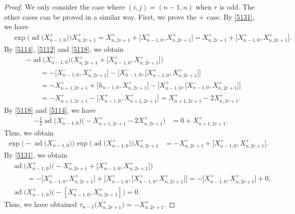 \documentclass[pdftex]{sigma}
\numberwithin{equation}{section}
\theoremstyle{definition}
\DeclareMathOperator{\ad}{ad}
\begin{document}
\begin{proof}
We only consider the case where $(i,j)=(n-1,n)$ when $r$ is odd. The other cases can be proved in a similar way. First, we prove the $+$ case. By \eqref{5131}, we have
\begin{align*}
&\exp\bigl(\ad\bigl(X^+_{n-1,0}\bigr)\bigr)X^+_{n,2r+1}=X^+_{n,2r+1}+\bigl[X^+_{n-1,0},X^+_{n,2r+1}\bigr]=X^+_{n,2r+1}+\bigl[X^+_{n-1,0},X^+_{n,2r+1}\bigr].
\end{align*}
By \eqref{5114}, \eqref{5112} and \eqref{5118}, we obtain
\begin{align*}
&-\ad\bigl(X^-_{n-1,0}\bigr)\bigl(X^+_{n,2r+1}+\bigl[X^+_{n-1,0},X^+_{n,2r+1}\bigr]\bigr)\\
&\qquad{}=-\bigl[X^-_{n-1,0},X^+_{n,2r+1}\bigr]-\bigl[X^-_{n-1,0},\bigl[X^+_{n-1,0},X^+_{n,2r+1}\bigr]\bigr]\\
&\qquad{}=-X^+_{n+1,2r+1}+\bigl[h_{n-1,0},X^+_{n,2r+1}\bigr]-\bigl[X^+_{n-1,0},\bigl[X^-_{n-1,0},X^+_{n,2r+1}\bigr]\bigr]\\
&\qquad{}=-X^+_{n+1,2r+1}-\bigl[X^+_{n-1,0},X^+_{n+1,2r+1}\bigr]=X^+_{n+1,2r+1}-2X^+_{n,2r+1}.
\end{align*}
By \eqref{5118} and \eqref{5114}, we have
\begin{align*}
-\frac{1}{2}\ad\bigl(X^-_{n-1,0}\bigr)\bigl(-X^+_{n+1,2r+1}-2X^+_{n,2r+1}\bigr)
&=0+X^+_{n+1,2r+1}.
\end{align*}
Thus, we obtain
\begin{align*}
\exp\bigl(-\ad\bigl(X^-_{n-1,0}\bigr)\bigr)\exp\bigl(\ad\bigl(X^+_{n-1,0}\bigr)\bigr)X^+_{n,2r+1}&=-X^+_{n,2r+1}+\bigl[X^+_{n-1,0},X^+_{n,2r+1}\bigr].
\end{align*}
By \eqref{5131}, we obtain
\begin{align*}
&\ad\bigl(X^+_{n-1,0}\bigr)\bigl(-X^+_{n,2r+1}+\bigl[X^+_{n-1,0},X^+_{n,2r+1}\bigr]\bigr)\\
&\qquad{}=-\bigl[X^+_{n-1,0},X^+_{n,2r+1}\bigr]+\bigl[X^+_{n-1,0},\bigl[X^+_{n-1,0},X^+_{n,2r+1}\bigr]\bigr] =-\bigl[X^+_{n-1,0},X^+_{n,2r+1}\bigr]+0,
\\
& \ad\bigl(X^+_{n-1,0}\bigr)\bigl(-[X^+_{n-1,0},X^+_{n,2r+1}]\bigr)=0.
\end{align*}
Thus, we have obtained $\tau_{n-1}\bigl(X^+_{n,2r+1}\bigr)=-X^+_{n,2r+1}$.


\end{proof}
\end{document}
